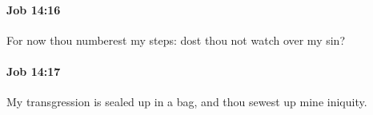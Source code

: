 		\paragraph{Job 14:16} %
			\label{JOB-14-16}

			For now thou numberest my steps: dost thou not watch over my sin?


		\paragraph{Job 14:17} %
			\label{JOB-14-17}

			My transgression is sealed up in a bag, and thou sewest up mine iniquity.


